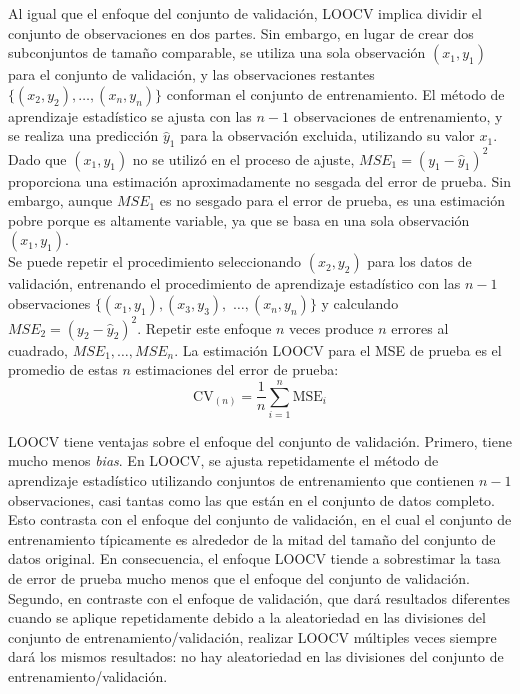 Al igual que el enfoque del conjunto de validación, LOOCV implica dividir el conjunto de observaciones en dos partes. Sin embargo, en lugar de crear dos subconjuntos de tamaño comparable, se utiliza una sola observación $(x_1, y_1)$ para el conjunto de validación, y las observaciones restantes $\{(x_2, y_2), \dots, (x_n, y_n)\}$ conforman el conjunto de entrenamiento. El método de aprendizaje estadístico se ajusta con las $n-1$ observaciones de entrenamiento, y se realiza una predicción $\hat{y}_1$ para la observación excluida, utilizando su valor $x_1$. Dado que $(x_1, y_1)$ no se utilizó en el proceso de ajuste, $MSE_1 = (y_1 - \hat{y}_1)^2$ proporciona una estimación aproximadamente no sesgada del error de prueba. Sin embargo, aunque $MSE_1$ es no sesgado para el error de prueba, es una estimación pobre porque es altamente variable, ya que se basa en una sola observación $(x_1, y_1)$. \\

Se puede repetir el procedimiento seleccionando $(x_2, y_2)$ para los datos de validación, entrenando el procedimiento de aprendizaje estadístico con las $n-1$ observaciones $\{(x_1, y_1), (x_3, y_3),$  $\dots, (x_n, y_n)\}$ y calculando $MSE_2 = (y_2 - \hat{y}_2)^2$. Repetir este enfoque $n$ veces produce $n$ errores al cuadrado, $MSE_1, \dots, MSE_n$. La estimación LOOCV para el MSE de prueba es el promedio de estas $n$ estimaciones del error de prueba:
\begin{equation}
\text{CV}_{(n)} = \frac{1}{n} \sum_{i=1}^{n} \text{MSE}_i 
\end{equation}

LOOCV tiene ventajas sobre el enfoque del conjunto de validación. Primero, tiene mucho menos \textit{bias}. En LOOCV, se ajusta repetidamente el método de aprendizaje estadístico utilizando conjuntos de entrenamiento que contienen $n-1$ observaciones, casi tantas como las que están en el conjunto de datos completo. Esto contrasta con el enfoque del conjunto de validación, en el cual el conjunto de entrenamiento típicamente es alrededor de la mitad del tamaño del conjunto de datos original. En consecuencia, el enfoque LOOCV tiende a sobrestimar la tasa de error de prueba mucho menos que el enfoque del conjunto de validación. Segundo, en contraste con el enfoque de validación, que dará resultados diferentes cuando se aplique repetidamente debido a la aleatoriedad en las divisiones del conjunto de entrenamiento/validación, realizar LOOCV múltiples veces siempre dará los mismos resultados: no hay aleatoriedad en las divisiones del conjunto de entrenamiento/validación. \\

